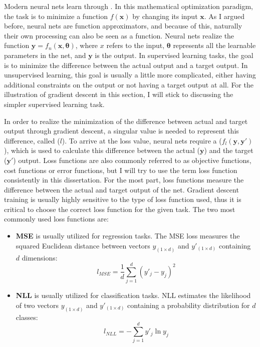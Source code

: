 			Modern neural nets learn through .
			In this mathematical optimization paradigm, the task is to minimize a function $f(\mathbf{x})$ by changing its input $\mathbf{x}$.
			As I argued before, neural nets are function approximators, and because of this, naturally their own processing can also be seen as a function.
			Neural nets realize the function $\mathbf{y} = f_n(\mathbf{x}, \mathbf{\theta})$, where $x$ refers to the input, $\mathbf{\theta}$ represents all the learnable parameters in the net, and $\mathbf{y}$ is the output.	
			In supervised learning tasks, the goal is to minimize the difference between the actual output and a target output.
			In unsupervised learning, this goal is usually a little more complicated, either having additional constraints on the output or not having a target output at all.
			For the illustration of gradient descent in this section, I will stick to discussing the simpler supervised learning task.
				
			In order to realize the minimization of the difference between actual and target output through gradient descent, a singular value is needed to represent this difference, called  ($l$).
			To arrive at the loss value, neural nets require a  ($f_l(\mathbf{y}, \mathbf{y}')$), which is used to calculate this difference between the actual ($\mathbf{y}$) and the target ($\mathbf{y}'$) output.
			Loss functions are also commonly referred to as objective functions, cost functions or error functions, but	I will try to use the term loss function consistently in this dissertation.		
			For the most part, loss functions measure the difference between the actual and target output of the net.
			Gradient descent training is usually highly sensitive to the type of loss function used, thus it is critical to choose the correct loss function for the given task.
			The two most commonly used loss functions are:
			\begin{itemize}
				\item \textbf{\ac{MSE}} is usually utilized for regression tasks. The \ac{MSE} loss measures the squared Euclidean distance between vectors $y_{(1 \times d)}$ and $y'_{(1 \times d)}$ containing  $d$ dimensions:
				\begin{equation}
				l_{MSE} = \frac{1}{d} \sum_{j=1}^{d} (y'_{j} - y_{j})^2
				\end{equation}		
				
				\item \textbf{\ac{NLL}} is usually utilized for classification tasks. \ac{NLL} estimates the likelihood of two vectors $y_{(1 \times d)}$ and $y'_{(1 \times d)}$ containing a probability distribution for $d$ classes:
				\begin{equation}
				\label{eq:nll}
				l_{NLL} = -\sum_{j=1}^{d} y'_{j}\ln{y_{j}}
				\end{equation}
			\end{itemize}
			
